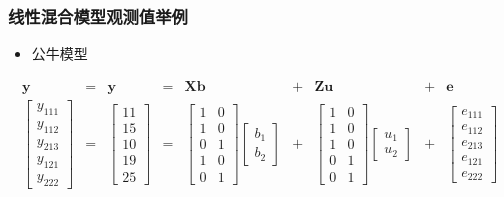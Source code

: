 \documentclass[serif,aspectratio=169]{beamer}
\begin{document}
\begin{frame}
  \frametitle{线性混合模型观测值举例}
  \begin{itemize}
  \item 公牛模型
  \end{itemize}
  $$
  \begin{array}{ccccccccc}
    \mathbf{y} & = & \mathbf{y} & = & \mathbf{Xb} & + & \mathbf{Zu} & + & \mathbf{e}\\
    \left[\begin{array}{c}
        y_{111}\\
        y_{112}\\
        y_{213}\\
        y_{121}\\
        y_{222}
      \end{array}\right] & = &
    \left[\begin{array}{c}
        11\\
        15\\
        10\\
        19\\
        25
      \end{array}\right] & = &
    \left[\begin{array}{cc}
        1 & 0\\
        1 & 0\\
        0 & 1\\
        1 & 0\\
        0 & 1
      \end{array}\right]
    \left[\begin{array}{c}b_1\\b_2\end{array}\right] & + &
    \left[\begin{array}{cc}
        1 & 0\\
        1 & 0\\
        1 & 0\\
        0 & 1\\
        0 & 1
      \end{array}\right]
    \left[\begin{array}{c}u_1\\u_2\end{array}\right] & + &
    \left[\begin{array}{c}
        e_{111}\\
        e_{112}\\
        e_{213}\\
        e_{121}\\
        e_{222}
      \end{array}\right]
  \end{array}
  $$
  
\end{frame}
\end{document}

